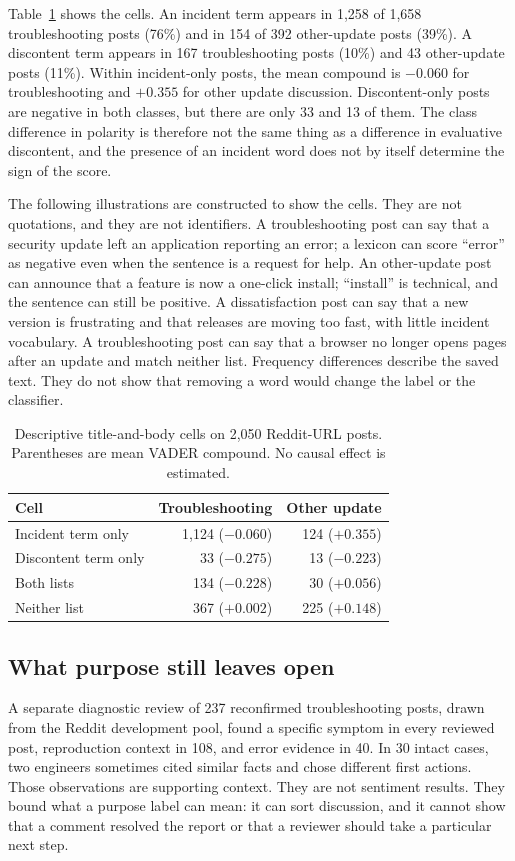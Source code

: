 \documentclass[conference,letterpaper]{IEEEtran}
\begin{document}
Table~\ref{tab:words} shows the cells. An incident term appears in 1,258 of 1,658 troubleshooting posts (76\%) and in 154 of 392 other-update posts (39\%). A discontent term appears in 167 troubleshooting posts (10\%) and 43 other-update posts (11\%). Within incident-only posts, the mean compound is $-0.060$ for troubleshooting and $+0.355$ for other update discussion. Discontent-only posts are negative in both classes, but there are only 33 and 13 of them. The class difference in polarity is therefore not the same thing as a difference in evaluative discontent, and the presence of an incident word does not by itself determine the sign of the score.

The following illustrations are constructed to show the cells. They are not quotations, and they are not identifiers. A troubleshooting post can say that a security update left an application reporting an error; a lexicon can score ``error'' as negative even when the sentence is a request for help. An other-update post can announce that a feature is now a one-click install; ``install'' is technical, and the sentence can still be positive. A dissatisfaction post can say that a new version is frustrating and that releases are moving too fast, with little incident vocabulary. A troubleshooting post can say that a browser no longer opens pages after an update and match neither list. Frequency differences describe the saved text. They do not show that removing a word would change the label or the classifier.

\begin{table}[t]
\caption{Descriptive title-and-body cells on 2,050 Reddit-URL posts. Parentheses are mean VADER compound. No causal effect is estimated.}
\label{tab:words}
\centering
\footnotesize
\begin{tabular}{lrr}
\toprule
Cell & Troubleshooting & Other update \\
\midrule
Incident term only & 1,124 ($-0.060$) & 124 ($+0.355$) \\
Discontent term only & 33 ($-0.275$) & 13 ($-0.223$) \\
Both lists & 134 ($-0.228$) & 30 ($+0.056$) \\
Neither list & 367 ($+0.002$) & 225 ($+0.148$) \\
\bottomrule
\end{tabular}
\end{table}

\subsection{What purpose still leaves open}
A separate diagnostic review of 237 reconfirmed troubleshooting posts, drawn from the Reddit development pool, found a specific symptom in every reviewed post, reproduction context in 108, and error evidence in 40. In 30 intact cases, two engineers sometimes cited similar facts and chose different first actions. Those observations are supporting context. They are not sentiment results. They bound what a purpose label can mean: it can sort discussion, and it cannot show that a comment resolved the report or that a reviewer should take a particular next step.
\end{document}
